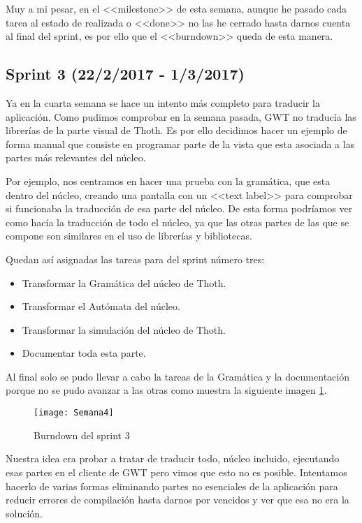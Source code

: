 Muy a mi pesar, en el <<milestone>> de esta semana, aunque he pasado cada tarea al estado de realizada o <<done>> no las he cerrado hasta darnos cuenta al final del sprint, es por ello que el <<burndown>> queda de esta manera.


\subsection{Sprint 3 (22/2/2017 - 1/3/2017)}

Ya en la cuarta semana se hace un intento más completo para traducir la aplicación. Como pudimos comprobar en la semana pasada, GWT no traducía las librerías de la parte visual de Thoth. Es por ello decidimos hacer un ejemplo de forma manual que consiste en programar parte de la vista que esta asociada a las partes más relevantes del núcleo.

Por ejemplo, nos centramos en hacer una prueba con la gramática, que esta dentro del núcleo, creando una pantalla con un <<text label>> para comprobar si funcionaba la traducción de esa parte del núcleo. De esta forma podríamos ver como hacía la traducción de todo el núcleo, ya que las otras partes de las que se compone son similares en el uso de librerías y bibliotecas.

Quedan así asignadas las tareas para del sprint número tres:

\begin{itemize}
\item Transformar la Gramática del núcleo de Thoth.
\item Transformar el Autómata del núcleo.
\item Transformar la simulación del núcleo de Thoth.
\item Documentar toda esta parte.
\end{itemize}

Al final solo se pudo llevar a cabo la tareas de la Gramática y la documentación porque no se pudo avanzar a las otras como muestra la siguiente imagen \ref{fig:A.2}.

\begin{figure}[h]
\centering
\texttt{[image: Semana4]}
\caption{Burndown del sprint 3}
\label{fig:A.2}
\end{figure}

 Nuestra idea era probar a tratar de traducir todo, núcleo incluido, ejecutando esas partes en el cliente de GWT  pero vimos que esto no es posible. Intentamos hacerlo de varias formas eliminando partes no esenciales de la aplicación para reducir errores de compilación hasta darnos por vencidos y ver que esa no era la solución.

